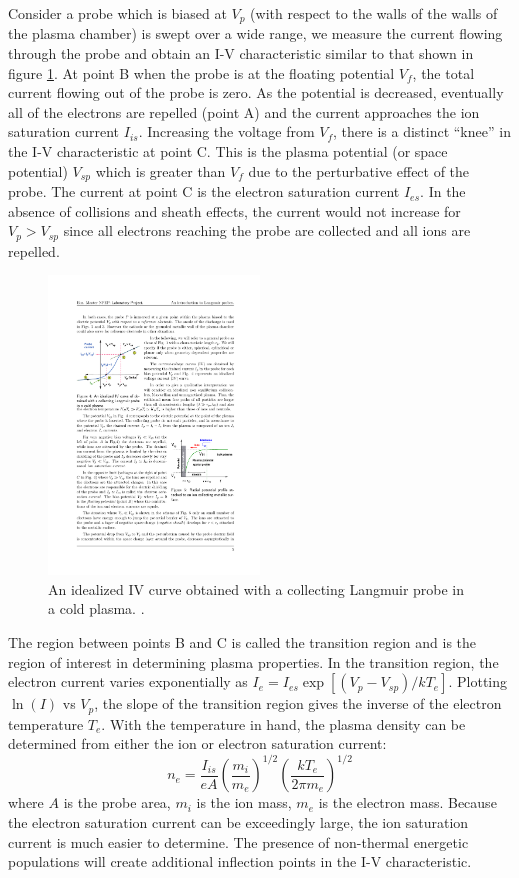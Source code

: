 \documentclass{jpp}
\begin{document}
Consider a probe which is biased at $V_p$ (with respect to the walls of the walls of the plasma chamber) is swept over a wide range, we measure the current flowing through the probe and obtain an I-V characteristic similar to that shown in figure \ref{fig:langmuir}. At point B when the probe is at the floating potential $V_f$, the total current flowing out of the probe is zero. As the potential is decreased, eventually all of the electrons are repelled (point A) and the current approaches the ion saturation current $I_{is}$. Increasing the voltage from $V_f$, there is a distinct ``knee'' in the I-V characteristic at point C. This is the plasma potential (or space potential) $V_{sp}$ which is greater than $V_f$ due to the perturbative effect of the probe. The current at point C is the electron saturation current $I_{es}$. In the absence of collisions and sheath effects, the current would not increase for $V_p > V_{sp}$ since all electrons reaching the probe are collected and all ions are repelled.
\begin{figure}
  \centering
  \includegraphics[width=0.5\textwidth]{langmuir-iv-curve.pdf}
  \caption{An idealized IV curve obtained with a collecting Langmuir probe in a cold plasma. \citep{Conde2011AnIT}.}
\label{fig:langmuir}
\end{figure}
The region between points B and C is called the transition region and is the region of interest in determining plasma properties. In the transition region, the electron current varies exponentially as $I_e = I_{es} \exp [(V_p - V_{sp})/ k T_e]$. Plotting $\ln(I)$ vs $V_p$, the slope of the transition region gives the inverse of the electron temperature $T_e$. With the temperature in hand, the plasma density can be determined from either the ion or electron saturation current:
\begin{equation*}
n_e = \frac{I_{is}}{e A} \left( \frac{m_i}{m_e} \right)^{1/2} \left( \frac{k T_e}{2 \pi m_e} \right) ^{1/2}
\end{equation*}
where $A$ is the probe area, $m_i$ is the ion mass, $m_e$ is the electron mass. Because the electron saturation current can be exceedingly large, the ion saturation current is much easier to determine. The presence of non-thermal energetic populations will create additional inflection points in the I-V characteristic.
\end{document}
